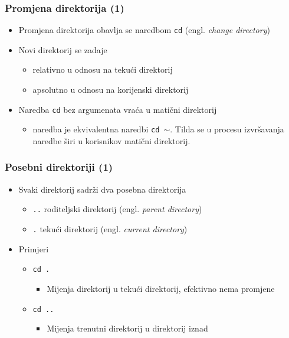 \documentclass{beamer}
\begin{document}
\begin{frame}[t]
\frametitle{Promjena direktorija (1)}
\begin{itemize}
  \item Promjena direktorija obavlja se naredbom \texttt{cd} (engl.
        \emph{change directory})
  \item Novi direktorij se zadaje
  \begin{itemize}
    \item relativno u odnosu na tekući direktorij
    \item apsolutno u odnosu na korijenski direktorij
  \end{itemize}
  \item Naredba \texttt{cd} bez argumenata vraća u matični direktorij
  \begin{itemize}
    \item naredba je ekvivalentna naredbi \texttt{cd $\sim$}. Tilda se u procesu
        izvršavanja naredbe širi u korisnikov matični direktorij.
  \end{itemize}
\end{itemize}
\end{frame}

\begin{frame}[t]
\frametitle{Posebni direktoriji (1)}
\begin{itemize}
  \item Svaki direktorij sadrži dva posebna direktorija
  \begin{itemize}
    \item \texttt{..} roditeljski direktorij (engl. \emph{parent directory})
    \item \texttt{.} tekući direktorij (engl. \emph{current directory})
  \end{itemize}
  \item Primjeri
  \begin{itemize}
    \item \texttt{cd . }
    \begin{itemize}
      \item Mijenja direktorij u tekući direktorij, efektivno nema
               promjene
    \end{itemize}
    \item \texttt{cd .. }
    \begin{itemize}
      \item Mijenja trenutni direktorij u direktorij iznad
    \end{itemize}
  \end{itemize}
\end{itemize}
\end{frame}
\end{document}
